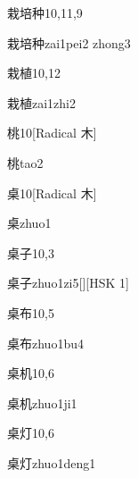 \begin{entry}{栽培种}{10,11,9}
  \begin{phonetics}{栽培种}{zai1pei2 zhong3}
  \end{phonetics}
\end{entry}

\begin{entry}{栽植}{10,12}
  \begin{phonetics}{栽植}{zai1zhi2}
  \end{phonetics}
\end{entry}

\begin{entry}{桃}{10}[Radical 木]
  \begin{phonetics}{桃}{tao2}
  \end{phonetics}
\end{entry}

\begin{entry}{桌}{10}[Radical 木]
  \begin{phonetics}{桌}{zhuo1}
  \end{phonetics}
\end{entry}

\begin{entry}{桌子}{10,3}
  \begin{phonetics}{桌子}{zhuo1zi5}[][HSK 1]
  \end{phonetics}
\end{entry}

\begin{entry}{桌布}{10,5}
  \begin{phonetics}{桌布}{zhuo1bu4}
  \end{phonetics}
\end{entry}

\begin{entry}{桌机}{10,6}
  \begin{phonetics}{桌机}{zhuo1ji1}
  \end{phonetics}
\end{entry}

\begin{entry}{桌灯}{10,6}
  \begin{phonetics}{桌灯}{zhuo1deng1}
  \end{phonetics}
\end{entry}

